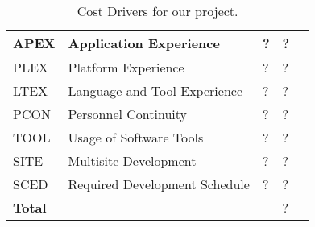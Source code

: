 \begin{table}[h]
\begin{tabular}{| l | l | l | l | l |}
        \hline
        APEX            & Application Experience                    & ?                 & ?                 \\
        \hline
        PLEX            & Platform Experience                       & ?                 & ?                 \\
        \hline
        LTEX            & Language and Tool Experience              & ?                 & ?                 \\
        \hline
        PCON            & Personnel Continuity                      & ?                 & ?                 \\
        \hline
        TOOL            & Usage of Software Tools                   & ?                 & ?                 \\
        \hline
        SITE            & Multisite Development                     & ?                 & ?                 \\
        \hline
        SCED            & Required Development Schedule             & ?                 & ?                 \\
        \hline
        \textbf{Total}  & \multicolumn{2}{|c|}{~}                                       & ?                 \\
        \hline
    \end{tabular}
    \caption{Cost Drivers for our project.}
    \label{tab:cost-drivers}
\end{table}
